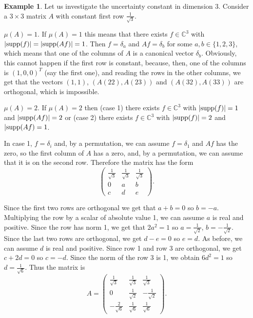 \documentclass[11pt]{amsart}
\theoremstyle{definition}
\newtheorem{example}[theorem]{Example}
\theoremstyle{remark}
\numberwithin{equation}{section}
\newcommand{\bc}{\mathbb{C}}
\newcommand{\suport}{\textup{supp}}
\begin{document}
\begin{example}\label{exu7}
Let us investigate the uncertainty constant in dimension 3. Consider a $3\times 3$ matrix $A$ with constant first row $\frac1{\sqrt{3}}$.

 $\mu(A)=1$. If $\mu(A)=1$ this means that there exists $f\in \bc^3$ with $|\suport (f)|=|\suport(Af)|=1$. Then $f=\delta_a$ and $Af=\delta_b$ for some $a,b\in\{1,2,3\}$, which means that one of the columns of $A$ is a canonical vector $\delta_b$. Obviously, this cannot happen if the first row is constant, because, then, one of the columns is $(1,0,0)^T$ (say the first one), and reading the rows in the other columns, we get that the vectors $(1,1)$, $(A(22),A(23))$ and $(A(32),A(33))$ are orthogonal, which is impossible.


$\mu(A)=2$. If $\mu(A)=2$ then (case 1) there exists $f\in\bc^3$ with $|\suport(f)|=1$ and $|\suport(Af)|=2$ or (case 2) there exists $f\in\bc^3$ with $|\suport(f)|=2$ and $|\suport(Af)=1$.

In case 1, $f=\delta_i$ and, by a permutation, we can assume $f=\delta_1$ and $Af$ has the zero, so the first column of $A$ has a zero, and, by a permutation, we can assume that it is on the second row. Therefore the matrix has the form
$$\begin{pmatrix}
	\frac{1}{\sqrt{3}}&\frac{1}{\sqrt{3}}&\frac{1}{\sqrt{3}}\\
	0&a&b\\
	c&d&e
\end{pmatrix}.
$$

Since the first two rows are orthogonal we get that $a+b=0$ so $b=-a$. Multiplying the row by a scalar of absolute value 1, we can assume $a$ is real and positive. Since the row has norm 1, we get that $2a^2=1$ so $a=\frac{1}{\sqrt{2}}$, $b=-\frac{1}{\sqrt{2}}$. Since the last two rows are orthogonal, we get $d-e=0$ so $e=d$. As before, we can assume $d$ is real and positive. Since row 1 and row 3 are orthogonal, we get $c+2d=0$ so $c=-d$. Since the norm of the row 3 is 1, we obtain $6d^2=1$ so $d=\frac{1}{\sqrt{6}}$. Thus the matrix is
\begin{equation}\label{equ7.1}
A=\begin{pmatrix}
	\frac{1}{\sqrt{3}}&\frac{1}{\sqrt{3}}&\frac{1}{\sqrt{3}}\\
	0&\frac{1}{\sqrt{2}}&-\frac{1}{\sqrt{2}}\\
	-\frac{2}{\sqrt{6}}&\frac{1}{\sqrt{6}}&\frac{1}{\sqrt{6}}
\end{pmatrix}.
\end{equation}



\end{example}
\end{document}
